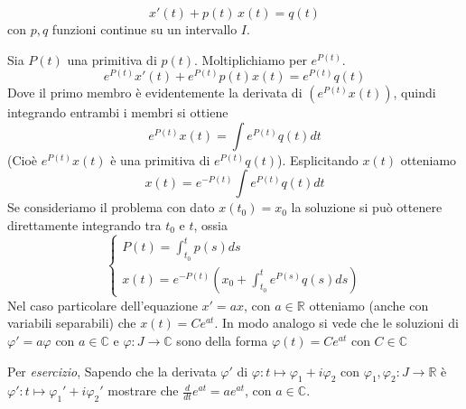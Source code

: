 \begin{example}
    \[
        x'(t) + p(t)\,x(t) = q(t)
    \]
    con \(p, q\) funzioni continue su un intervallo \(I\).

    Sia \(P(t)\) una primitiva di \(p(t)\). Moltiplichiamo per \(e^{P(t)}\).
    \[
        e^{P(t)}x'(t) + e^{P(t)}p(t)x(t) = e^{P(t)}q(t)
    \]
    Dove il primo membro è evidentemente la derivata di \((e^{P(t)}x(t))\),
    quindi integrando entrambi i membri si ottiene
    \[
        e^{P(t)}x(t) = \int e^{P(t)}q(t) dt
    \]
    (Cioè \(e^{P(t)} x(t)\) è una primitiva di \(e^{P(t)} q(t)\)). Esplicitando
    \(x(t)\) otteniamo
    \[
        x(t) = e^{-P(t)} \int e^{P(t)}q(t) dt
    \]
    Se consideriamo il problema con dato \(x(t_{0}) = x_{0}\) la soluzione si
    può ottenere direttamente integrando tra \(t_{0}\) e \(t\), ossia
    \[
        \begin{cases}
            \displaystyle
            P(t) = \int_{t_{0}}^{t} p(s) ds \\
            \displaystyle
            x(t) = e^{-P(t)} \left( x_{0} + \int_{t_{0}}^{t} e^{P(s)}q(s) ds
                \right)
        \end{cases}
    \]
    Nel caso particolare dell'equazione \(x' = ax\), con \(a \in \mathbb{R}\)
    otteniamo (anche con variabili separabili) che \(x(t) = Ce^{at}\). In modo
    analogo si vede che le soluzioni di \(\varphi' = a\varphi\) con \(a \in
    \mathbb{C}\) e \(\varphi : J \to \mathbb{C}\) sono della forma \(\varphi(t)
    = C e ^{a t}\) con \(C \in \mathbb{C}\) 
    
    Per \emph{esercizio}, 
        Sapendo che la derivata \(\varphi'\) di \(\varphi : t \mapsto
        \varphi_{1} + i\varphi_{2}\) con \(\varphi_{1}, \varphi_{2} : J \to
        \mathbb{R} \) è \(\varphi' : t \mapsto \varphi_{1}' + i\varphi_{2}'\)
        mostrare che \(\frac{d}{dt}e^{at} = a e^{at}\), con \(a \in
        \mathbb{C}\).
\end{example}

